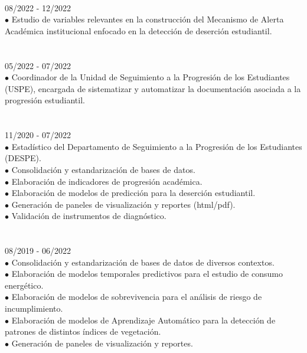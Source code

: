 \documentclass[letterpaper,10pt,spanish]{article}
\begin{document}
\begin{minipage}[t]{0.72\textwidth}
\begin{minipage}[t]{0.45\textwidth}
{ \\ 08/2022 - 12/2022}\\
$\bullet$ Estudio de variables relevantes en la construcción del Mecanismo de Alerta Académica institucional enfocado en la detección de deserción estudiantil.\\
\
\\
{ \\ 05/2022 - 07/2022}\\
$\bullet$ Coordinador de la Unidad de Seguimiento a la Progresión de los Estudiantes (USPE), encargada de sistematizar y automatizar la documentación asociada a la progresión estudiantil.\\
\
\\
{ \\ 11/2020 - 07/2022}\\
$\bullet$ Estadístico del Departamento de Seguimiento a la Progresión de los Estudiantes (DESPE).\\
$\bullet$ Consolidación y estandarización de bases de datos.\\
$\bullet$ Elaboración de indicadores de progresión académica.\\
$\bullet$ Elaboración de modelos de predicción para la deserción estudiantil.\\
$\bullet$ Generación de paneles de visualización y reportes (html/pdf).\\
$\bullet$ Validación de instrumentos de diagnóstico.\\
\
\\
{ \\ 08/2019 - 06/2022}\\
$\bullet$ Consolidación y estandarización de bases de datos de diversos contextos.\\
$\bullet$ Elaboración de modelos temporales predictivos para el estudio de consumo energético.\\
$\bullet$ Elaboración de modelos de sobrevivencia para el análisis de riesgo de incumplimiento.\\
$\bullet$ Elaboración de modelos de Aprendizaje Automático para la detección de patrones de distintos índices de vegetación.\\
$\bullet$ Generación de paneles de visualización y reportes.\\
\
\\

\end{minipage}
\end{minipage}
\end{document}
